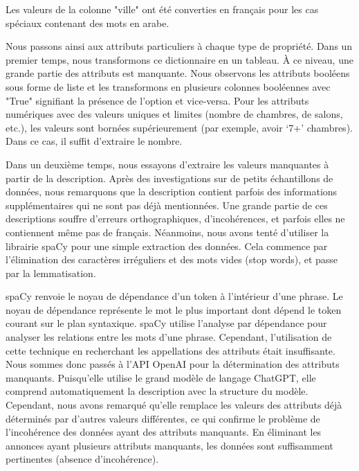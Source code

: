 \documentclass[a4paper,12pt]{report}
\numberwithin{equation}{section}
\begin{document}
Les valeurs de la colonne "ville" ont été converties en français pour les cas spéciaux contenant des mots en arabe.
\\ \par
Nous passons ainsi aux attributs particuliers à chaque type de propriété. Dans un premier temps, nous transformons ce dictionnaire en un tableau. À ce niveau, une grande partie des attributs est manquante. Nous observons les attributs booléens sous forme de liste et les transformons en plusieurs colonnes booléennes avec "True" signifiant la présence de l’option et vice-versa. Pour les attributs numériques avec des valeurs uniques et limites (nombre de chambres, de salons, etc.), les valeurs sont bornées supérieurement (par exemple, avoir ‘7+’ chambres). Dans ce cas, il suffit d’extraire le nombre.
\\ \par
Dans un deuxième temps, nous essayons d’extraire les valeurs manquantes à partir de la description. Après des investigations sur de petits échantillons de données, nous remarquons que la description contient parfois des informations supplémentaires qui ne sont pas déjà mentionnées. Une grande partie de ces descriptions souffre d’erreurs orthographiques, d’incohérences, et parfois elles ne contiennent même pas de français. Néanmoins, nous avons tenté d’utiliser la librairie spaCy pour une simple extraction des données. Cela commence par l'élimination des caractères irréguliers et des mots vides (stop words), et passe par la lemmatisation.
\\ \par
spaCy renvoie le noyau de dépendance d'un token à l'intérieur d'une phrase. Le noyau de dépendance représente le mot le plus important dont dépend le token courant sur le plan syntaxique. spaCy utilise l'analyse par dépendance pour analyser les relations entre les mots d'une phrase. Cependant, l’utilisation de cette technique en recherchant les appellations des attributs était insuffisante. Nous sommes donc passés à l’API OpenAI pour la détermination des attributs manquants. Puisqu’elle utilise le grand modèle de langage ChatGPT, elle comprend automatiquement la description avec la structure du modèle. Cependant, nous avons remarqué qu’elle remplace les valeurs des attributs déjà déterminés par d’autres valeurs différentes, ce qui confirme le problème de l'incohérence des données ayant des attributs manquants. En éliminant les annonces ayant plusieurs attributs manquants, les données sont suffisamment pertinentes (absence d'incohérence).
\\ \par 
\end{document}
